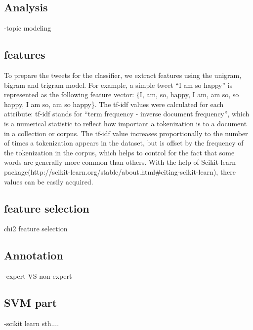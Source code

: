 \documentclass[11pt]{article}
\begin{document}
\subsection{Analysis}
-topic modeling \cite{Blei}

\subsection{features}

To prepare the tweets for the classifier, we extract features using the unigram, bigram and trigram model. For example, a simple tweet ``I am so happy'' is represented as the following feature vector: \{I, am, so, happy, I am, am so, so happy, I am so, am so happy\}. The tf-idf values were calculated for each attribute: tf-idf stands for ``term frequency - inverse document frequency'', which is a numerical statistic to reflect how important a tokenization is to a document in a collection or corpus. The tf-idf value increases proportionally to the number of times a tokenization appears in the dataset, but is offset by the frequency of the tokenization in the corpus, which helps to control for the fact that some words are generally more common than others. With the help of Scikit-learn package(http://scikit-learn.org/stable/about.html\#citing-scikit-learn), there values can be easily acquired. 

\subsection{feature selection}
chi2 feature selection

\subsection{Annotation}
-expert VS non-expert


\subsection{SVM part}
-scikit learn sth....
\end{document}
